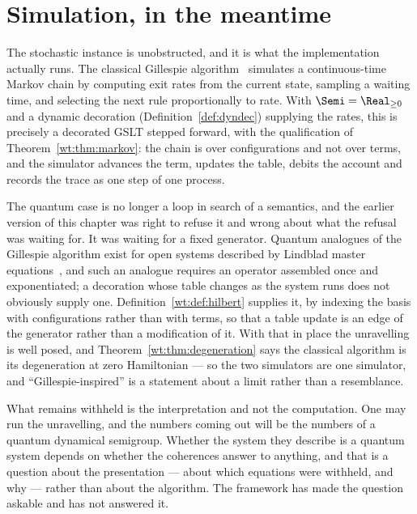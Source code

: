 \section{Simulation, in the meantime}

The stochastic instance is unobstructed, and it is what the implementation
actually runs.  The classical Gillespie algorithm~\cite{gillespie1977exact}
simulates a continuous-time Markov chain by computing exit rates from the
current state, sampling a waiting time, and selecting the next rule
proportionally to rate.  With $\Semi = \Real_{\geq 0}$ and a dynamic
decoration (Definition~\ref{def:dyndec}) supplying the rates, this is
precisely a decorated GSLT stepped forward, with the qualification of
Theorem~\ref{wt:thm:markov}: the chain is over configurations and not over
terms, and the simulator advances the term, updates the table, debits the
account and records the trace as one step of one process.

The quantum case is no longer a loop in search of a semantics, and the
earlier version of this chapter was right to refuse it and wrong about
what the refusal was waiting for.  It was waiting for a fixed generator.
Quantum analogues of the Gillespie algorithm exist for open systems
described by Lindblad master equations~\cite{cao2021quantum}, and such an
analogue requires an operator assembled once and exponentiated; a
decoration whose table changes as the system runs does not obviously
supply one.  Definition~\ref{wt:def:hilbert} supplies it, by indexing the
basis with configurations rather than with terms, so that a table update
is an edge of the generator rather than a modification of it.  With that
in place the unravelling is well posed, and
Theorem~\ref{wt:thm:degeneration} says the classical algorithm is its
degeneration at zero Hamiltonian --- so the two simulators are one
simulator, and ``Gillespie-inspired'' is a statement about a limit rather
than a resemblance.

What remains withheld is the interpretation and not the computation.  One
may run the unravelling, and the numbers coming out will be the numbers of
a quantum dynamical semigroup.  Whether the system they describe is a
quantum system depends on whether the coherences answer to anything, and
that is a question about the presentation --- about which equations were
withheld, and why --- rather than about the algorithm.  The framework has
made the question askable and has not answered it.

